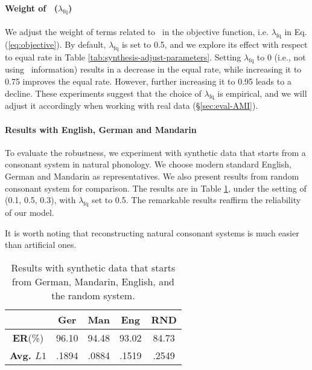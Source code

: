 \paragraph{Weight of \fq~($\lambda_{\text{fq}}$)} \label{sec:fq-weight}
We adjust the weight of terms related to \fq~in the objective function, i.e. $\lambda_{\text{fq}}$ in Eq. (\ref{eq:objective}). By default, $\lambda_{\text{fq}}$ is set to 0.5, and we explore its effect with respect to equal rate in Table \ref{tab:synthesis-adjust-parameters}. Setting $\lambda_{\text{fq}}$ to 0 (i.e., not using \fq~information) results in a decrease in the equal rate, while increasing it to 0.75 improves the equal rate. However, further increasing it to 0.95 leads to a decline. These experiments suggest that the choice of $\lambda_{\text{fq}}$ is empirical, and we will adjust it accordingly when working with real data (\S\ref{sec:eval-AMI}).

\paragraph{Results with English, German and Mandarin}
To evaluate the robustness, we experiment with synthetic data that starts from a consonant system in natural phonology. We choose modern standard English, German and Mandarin as representatives. 
We also present results from random consonant system for comparison.
The results are in Table \ref{tab:other-language}, under the setting of (0.1, 0.5, 0.3), with $\lambda_{\text{fq}}$ set to 0.5. The remarkable results reaffirm the reliability of our model.

It is worth noting that reconstructing natural consonant systems is much easier than artificial ones.

\begin{table}[htbp]
  \centering
\begin{tabular}{ccccc}
    \toprule
      & \textbf{Ger} & \textbf{Man} & \textbf{Eng} & \textbf{RND} \\
      \midrule
\textbf{ER}(\%) & 96.10 &  94.48   &  93.02  & 84.73 \\
\textbf{Avg. $L1$}\unboldmath{} & .1894 &  .0884    & .1519 & .2549 \\
    \bottomrule
\end{tabular}%
    \caption{\label{tab:other-language}Results with synthetic data that starts from German, Mandarin, English, and the random system.}
\end{table}%


